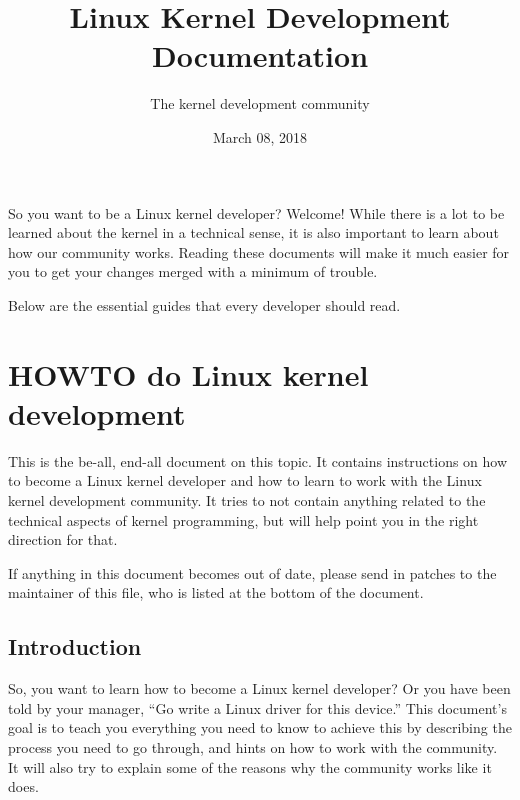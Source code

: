 \documentclass[a4paper,8pt,english]{sphinxmanual}
\title{Linux Kernel Development Documentation}
\date{March 08, 2018}
\author{The kernel development community}
\begin{document}
\maketitle
\tableofcontents
{}\label{process/index::doc}\renewcommand\thesection*
\renewcommand\thesubsection*


So you want to be a Linux kernel developer?  Welcome!  While there is a lot
to be learned about the kernel in a technical sense, it is also important
to learn about how our community works.  Reading these documents will make
it much easier for you to get your changes merged with a minimum of
trouble.

Below are the essential guides that every developer should read.


\chapter{HOWTO do Linux kernel development}
\label{process/howto:process-index}\label{process/howto:working-with-the-kernel-development-community}\label{process/howto::doc}\label{process/howto:howto-do-linux-kernel-development}
This is the be-all, end-all document on this topic.  It contains
instructions on how to become a Linux kernel developer and how to learn
to work with the Linux kernel development community.  It tries to not
contain anything related to the technical aspects of kernel programming,
but will help point you in the right direction for that.

If anything in this document becomes out of date, please send in patches
to the maintainer of this file, who is listed at the bottom of the
document.


\section{Introduction}
\label{process/howto:introduction}
So, you want to learn how to become a Linux kernel developer?  Or you
have been told by your manager, ``Go write a Linux driver for this
device.''  This document's goal is to teach you everything you need to
know to achieve this by describing the process you need to go through,
and hints on how to work with the community.  It will also try to
explain some of the reasons why the community works like it does.
\end{document}
